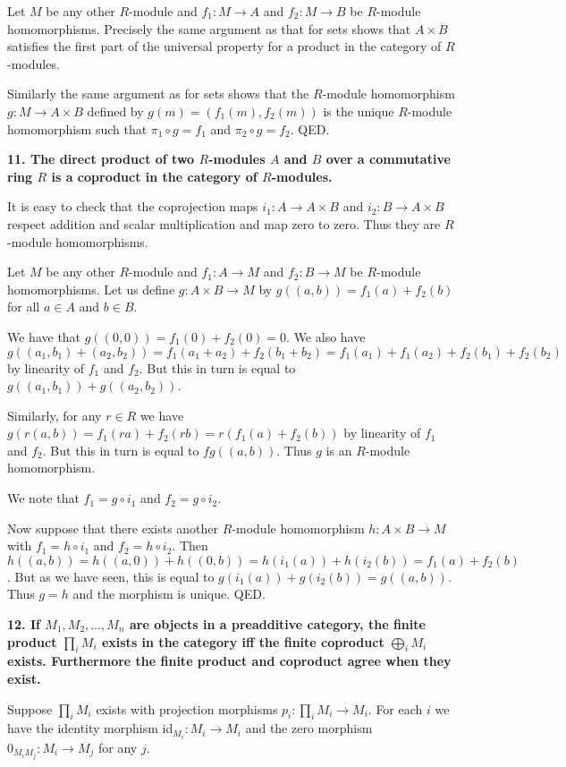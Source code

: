 \documentclass[12pt]{article}
\begin{document}
Let $M$ be any other $R$-module and $f_1 : M \to A$ and $f_2 : M \to B$ be $R$-module homomorphisms. Precisely the same argument as that for sets shows that $A\times B$ satisfies the first part of the universal property for a product in the category of $R$-modules.

Similarly the same argument as for sets shows that the $R$-module homomorphism $g : M \to A\times B$ defined by $g(m) = (f_1(m), f_2(m))$ is the unique $R$-module homomorphism such that $\pi_1\circ g = f_1$ and $\pi_2\circ g = f_2$. QED.

\textbf{11. The direct product of two $R$-modules $A$ and $B$ over a commutative ring $R$ is a coproduct in the category of $R$-modules.}

It is easy to check that the coprojection maps $i_1 : A \to A\times B$ and $i_2 : B \to A\times B$ respect addition and scalar multiplication and map zero to zero. Thus they are $R$-module homomorphisms.

Let $M$ be any other $R$-module and $f_1 : A \to M$ and $f_2 : B \to M$ be $R$-module homomorphisms. Let us define $g : A\times B \to M$ by $g((a, b)) = f_1(a) + f_2(b)$ for all $a \in A$ and $b \in B$.

We have that $g((0, 0)) = f_1(0) + f_2(0) = 0$. We also have $g((a_1, b_1) + (a_2, b_2)) = f_1(a_1 + a_2) + f_2(b_1 + b_2) = f_1(a_1) + f_1(a_2) + f_2(b_1) + f_2(b_2)$ by linearity of $f_1$ and $f_2$. But this in turn is equal to $g((a_1, b_1)) + g((a_2, b_2))$.

Similarly, for any $r \in R$ we have $g(r(a, b)) = f_1(ra) + f_2(rb) = r(f_1(a) + f_2(b))$ by linearity of $f_1$ and $f_2$. But this in turn is equal to $fg((a, b))$. Thus $g$ is an $R$-module homomorphism.

We note that $f_1 = g\circ i_1$ and $f_2 = g\circ i_2$.

Now suppose that there exists another $R$-module homomorphism $h : A\times B \to M$ with $f_1 = h\circ i_1$ and $f_2 = h\circ i_2$. Then $h((a, b)) = h((a, 0)) + h((0, b)) = h(i_1(a)) + h(i_2(b)) = f_1(a) + f_2(b)$. But as we have seen, this is equal to $g(i_1(a)) + g(i_2(b)) = g((a, b))$. Thus $g = h$ and the morphism is unique. QED.

\textbf{12. If $M_1, M_2, \ldots, M_n$ are objects in a preadditive category, the finite product $\prod_i M_i$ exists in the category iff the finite coproduct $\bigoplus_i M_i$ exists. Furthermore the finite product and coproduct agree when they exist.}

Suppose $\prod_i M_i$ exists with projection morphisms $p_i : \prod_i M_i \to M_i$. For each $i$ we have the identity morphism id$_{M_i} : M_i \to M_i$ and the zero morphism $0_{M_iM_j} : M_i \to M_j$ for any $j$.
\end{document}
